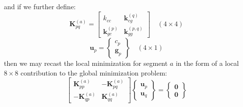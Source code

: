 \documentclass[11pt]{article} %
\begin{document}
and if we further define:
\begin{equation}
	\mathbf{K}_{pq}^{(a)} = \left[ \begin{array}{cc} k_{cc} & \mathbf{k}_{cg}^{(q)} \\ \mathbf{k}_{gc}^{(p)} & \mathbf{k}_{gg}^{(p,q)} \end{array} \right] \quad (4 \times 4)
\end{equation}
\begin{equation}
	\mathbf{u}_p = \left\{ \begin{array}{c} c_p \\ \mathbf{g}_p \end{array} \right\} \quad (4 \times 1)
\end{equation}
then we may recast the local minimization for segment $a$ in the form of a local $8\times8$ contribution to the global minimization problem:
\begin{equation}
	\left[ \begin{array}{cc} \mathbf{K}_{pp}^{(a)} & -\mathbf{K}_{pq}^{(a)} \\ -\mathbf{K}_{qp}^{(a)} & \mathbf{K}_{qq}^{(a)} \end{array} \right] \left\{ \begin{array}{c} \mathbf{u}_p \\ \mathbf{u}_q \end{array} \right\} = \left\{ \begin{array}{c} \mathbf{0} \\ \mathbf{0} \end{array} \right\}
\end{equation}
\end{document}
